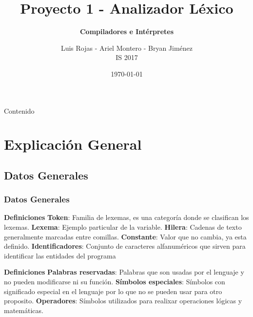 \documentclass{beamer}
\title[] {       \textbf{Proyecto 1 - Analizador Léxico}}\subtitle[Analizador Léxico]{\textbf{Compiladores e Intérpretes}}\author[Luis Rojas - Ariel Montero - Bryan Jiménez]{      Luis Rojas - Ariel Montero - Bryan Jiménez \\{\ttfamily IS 2017}}\institute[]{Instituto Tecnológico de Costa Rica\\}\date{\today}
\begin{document}
 
 {\1 \begin{frame} \titlepage \end{frame}} \begin{frame}{Contenido}{} \tableofcontents \end{frame} 
\section{Explicación General}\subsection{Datos Generales}\begin{frame}[allowframebreaks] 
\frametitle{Datos Generales} 
 
\begin{block}{\textbf{Definiciones}} 
\textbf{Token}: Familia de lexemas, es una categoría donde se clasifican los lexemas.\newline 
\textbf{Lexema}: Ejemplo particular de la variable.\newline 
\textbf{Hilera}: Cadenas de texto generalmente marcadas entre comillas. \newline 
\textbf{Constante}: Valor que no cambia, ya esta definido. \newline 
\textbf{Identificadores}: Conjunto de caracteres alfanuméricos que sirven para identificar las entidades del programa  \newline 
\end{block}
\begin{block}{\textbf{Definiciones}} 
\textbf{Palabras reservadas}: Palabras que son usadas por el lenguaje y no pueden modificarse ni su función. \newline 
\textbf{Símbolos especiales}: Símbolos con significado especial en el lenguaje por lo que no se pueden usar para  otro proposito.\newline 
\textbf{Operadores}: Símbolos utilizados para realixar operaciones lógicas y matemáticas. \newline 
\end{block}
\end{frame} 
\end{document}
